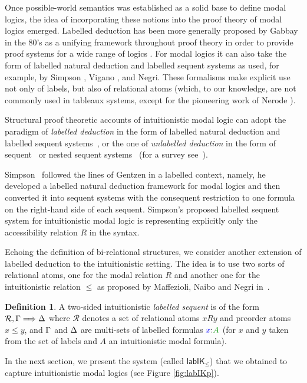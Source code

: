 \documentclass[a4paper]{article}
\theoremstyle{plain}
\theoremstyle{definition}
\newtheorem{definition}[theorem]{Definition}
\newcommand{\B}{\mathcal{R}}
\newcommand*{\lab}{\mathsf{lab}}
\newcommand*{\IK}{\mathsf{IK}}
\newcommand*{\labIKp}{\lab\IK_{\le}}
\newcommand*{\fm}[1]{{\color{notgreen}{#1}}}
\newcommand*{\lb}[1]{{\color{blue}{#1}}}
\newcommand*{\labels}[2]{\lb{#1}\mathord{:}\fm{#2}}
\newcommand{\SEQ}{\Longrightarrow}
\newcommand*{\rel}{R}
\begin{document}
Once possible-world semantics was established as a solid base to define modal logics, the idea of incorporating these notions into the proof theory of modal logics emerged.  Labelled deduction has been more generally proposed by Gabbay in the 80's as a unifying framework throughout proof theory in order to provide proof systems for a wide range of logics \cite{Gabbay}. For modal logics it can also take the form of labelled natural deduction and labelled sequent systems as used, for example, by Simpson \cite{Simpson}, Vigano \cite{Vigano}, and Negri\cite{Negri}. These formalisms make explicit use not only of labels, but also of relational atoms (which, to our knowledge, are not commonly used in tableaux systems, except for the pioneering work of Nerode \cite{Nerode}).

Structural proof theoretic accounts of intuitionistic modal logic can adopt the paradigm of \emph{labelled deduction} in the form of labelled natural deduction and labelled sequent systems~\cite{Simpson}, or the one of \emph{unlabelled deduction} in the form of sequent~\cite{Bierman} or nested sequent systems~\cite{Strassburger} (for a survey see~\cite[Chap.~3]{Marin}).

Simpson~\cite{Simpson} followed the lines of Gentzen in a labelled context, namely, he developed a labelled natural deduction framework for modal logics and then converted it into sequent systems with the consequent restriction to one formula on the right-hand side of each sequent. Simpson's proposed labelled sequent system for intuitionistic modal logic is representing explicitly only the accessibility relation $\rel$ in the syntax.
%

Echoing the definition of bi-relational structures, we consider another extension of labelled deduction to the intuitionistic setting. 
%
The idea is to use two sorts of relational atoms, one for the modal relation $\rel$ and another one for the intuitionistic relation $\leq$ as proposed by Maffezioli, Naibo and Negri in~\cite{Maffezioli}. 
%

\begin{definition}
A two-sided intuitionistic \emph{labelled sequent} is of the form $\B, \Left \SEQ \Right$ where $\B$ denotes a set of relational atoms $x \rel y$ and preorder atoms $x \le y$, and $\Gamma$ and $\Delta$ are multi-sets of labelled formulas $\labels{x}{A}$ (for $x$ and $y$ taken from the set of labels and $A$ an intuitionistic modal formula).
\end{definition}
In the next section, we present the system (called $\labIKp$) that we obtained to capture intuitionistic modal logics (see Figure \ref{fig:labIKp}).
\end{document}
